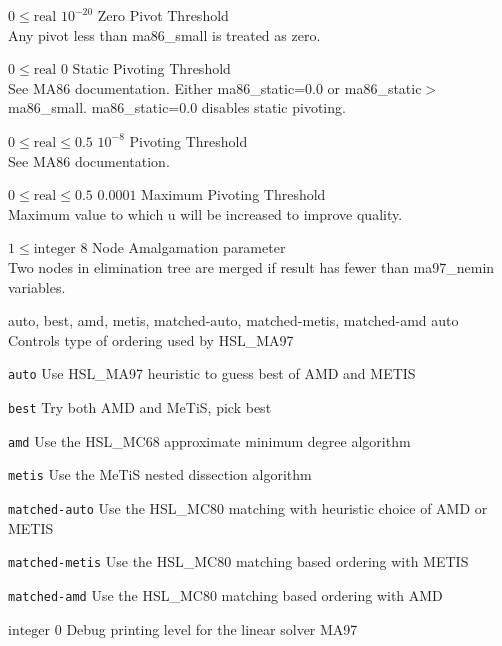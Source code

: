 %
{$0\leq\textrm{real}$}%
{$10^{-20}$}%
{Zero Pivot Threshold\\
Any pivot less than ma86\_small is treated as zero.}%
{}

%
{$0\leq\textrm{real}$}%
{$0$}%
{Static Pivoting Threshold\\
See MA86 documentation. Either ma86\_static=0.0 or ma86\_static$>$ma86\_small. ma86\_static=0.0 disables static pivoting.}%
{}

%
{$0\leq\textrm{real}\leq0.5$}%
{$10^{- 8}$}%
{Pivoting Threshold\\
See MA86 documentation.}%
{}

%
{$0\leq\textrm{real}\leq0.5$}%
{$0.0001$}%
{Maximum Pivoting Threshold\\
Maximum value to which u will be increased to improve quality.}%
{}

%
{$1\leq\textrm{integer}$}%
{$8$}%
{Node Amalgamation parameter\\
Two nodes in elimination tree are merged if result has fewer than ma97\_nemin variables.}%
{}

%
{\ttfamily auto, best, amd, metis, matched-auto, matched-metis, matched-amd}%
{auto}%
{Controls type of ordering used by HSL\_MA97}%
{\begin{list}{}{
\setlength{\parsep}{0em}
\setlength{\leftmargin}{5ex}
\setlength{\labelwidth}{2ex}
\setlength{\itemindent}{0ex}
\setlength{\topsep}{0pt}}
\item[\texttt{auto}] Use HSL\_MA97 heuristic to guess best of AMD and METIS
\item[\texttt{best}] Try both AMD and MeTiS, pick best
\item[\texttt{amd}] Use the HSL\_MC68 approximate minimum degree algorithm
\item[\texttt{metis}] Use the MeTiS nested dissection algorithm
\item[\texttt{matched-auto}] Use the HSL\_MC80 matching with heuristic choice of AMD or METIS
\item[\texttt{matched-metis}] Use the HSL\_MC80 matching based ordering with METIS
\item[\texttt{matched-amd}] Use the HSL\_MC80 matching based ordering with AMD
\end{list}
}

%
{$\textrm{integer}$}%
{$0$}%
{Debug printing level for the linear solver MA97}%
{}

